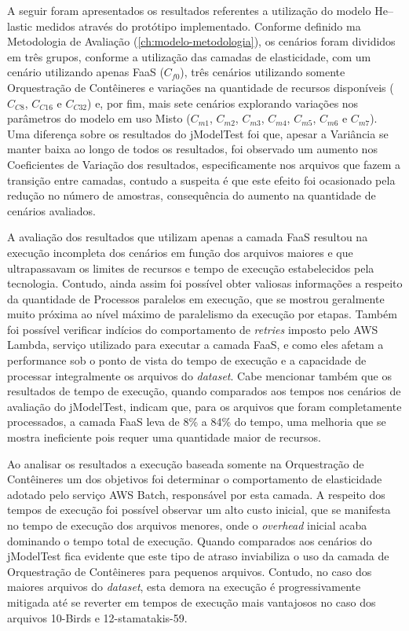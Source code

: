 \documentclass[english,brazilian]{UNISINOSmonografia} %
\begin{document}
A seguir foram apresentados os resultados referentes a utilização do modelo \textsf{He}--lastic medidos através do protótipo implementado.
%
Conforme definido ma Metodologia de Avaliação (\autoref{ch:modelo-metodologia}), os cenários foram divididos em três grupos, conforme a utilização das camadas de elasticidade, com um cenário utilizando apenas FaaS ($C_{f0}$), três cenários utilizando somente Orquestração de Contêineres e variações na quantidade de recursos disponíveis ($C_{C8}$, $C_{C16}$ e $C_{C32}$) e, por fim, mais sete cenários explorando variações nos parâmetros do modelo em uso Misto ($C_{m1}$, $C_{m2}$, $C_{m3}$, $C_{m4}$, $C_{m5}$, $C_{m6}$ e $C_{m7}$).
%
Uma diferença sobre os resultados do jModelTest foi que, apesar a Variância se manter baixa ao longo de todos os resultados, foi observado um aumento nos Coeficientes de Variação dos resultados, especificamente nos arquivos que fazem a transição entre camadas, contudo a suspeita é que este efeito foi ocasionado pela redução no número de amostras, consequência do aumento na quantidade de cenários avaliados.



A avaliação dos resultados que utilizam apenas a camada FaaS resultou na execução incompleta dos cenários em função dos arquivos maiores e que ultrapassavam os limites de recursos e tempo de execução estabelecidos pela tecnologia.
%
Contudo, ainda assim foi possível obter valiosas informações a respeito da quantidade de Processos paralelos em execução, que se mostrou geralmente muito próxima ao nível máximo de paralelismo da execução por etapas.
%
Também foi possível verificar indícios do comportamento de \textit{retries} imposto pelo AWS Lambda, serviço utilizado para executar a camada FaaS, e como eles afetam a performance sob o ponto de vista do tempo de execução e a capacidade de processar integralmente os arquivos do \textit{dataset}.
%
Cabe mencionar também que os resultados de tempo de execução, quando comparados aos tempos nos cenários de avaliação do jModelTest, indicam que, para os arquivos que foram completamente processados, a camada FaaS leva de 8\% a 84\% do tempo, uma melhoria que se mostra ineficiente pois requer uma quantidade maior de recursos.



Ao analisar os resultados a execução baseada somente na Orquestração de Contêineres um dos objetivos foi determinar o comportamento de elasticidade adotado pelo serviço AWS Batch, responsável por esta camada.
%
A respeito dos tempos de execução foi possível observar um alto custo inicial, que se manifesta no tempo de execução dos arquivos menores, onde o \textit{overhead} inicial acaba dominando o tempo total de execução.
%
Quando comparados aos cenários do jModelTest fica evidente que este tipo de atraso inviabiliza o uso da camada de Orquestração de Contêineres para pequenos arquivos.
%
Contudo, no caso dos maiores arquivos do \textit{dataset}, esta demora na execução é progressivamente mitigada até se reverter em tempos de execução mais vantajosos no caso dos arquivos 10-Birds e 12-stamatakis-59.
\end{document}

